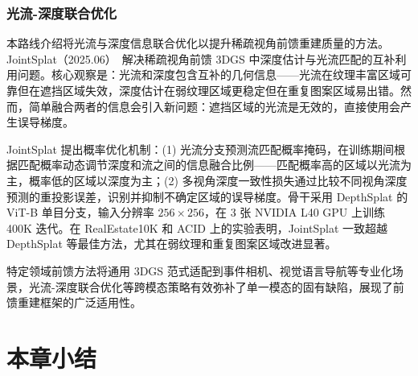 \subsubsection{光流-深度联合优化}

本路线介绍将光流与深度信息联合优化以提升稀疏视角前馈重建质量的方法。JointSplat（2025.06）~\cite{2506_03872}解决稀疏视角前馈 3DGS 中深度估计与光流匹配的互补利用问题。核心观察是：光流和深度包含互补的几何信息——光流在纹理丰富区域可靠但在遮挡区域失效，深度估计在弱纹理区域更稳定但在重复图案区域易出错。然而，简单融合两者的信息会引入新问题：遮挡区域的光流是无效的，直接使用会产生误导梯度。

JointSplat 提出概率优化机制：(1) 光流分支预测流匹配概率掩码，在训练期间根据匹配概率动态调节深度和流之间的信息融合比例——匹配概率高的区域以光流为主，概率低的区域以深度为主；(2) 多视角深度一致性损失通过比较不同视角深度预测的重投影误差，识别并抑制不确定区域的误导梯度。骨干采用 DepthSplat 的 ViT-B 单目分支，输入分辨率 $256 \times 256$，在 3 张 NVIDIA L40 GPU 上训练 400K 迭代。在 RealEstate10K 和 ACID 上的实验表明，JointSplat 一致超越 DepthSplat 等最佳方法，尤其在弱纹理和重复图案区域改进显著。

\begin{takeaway}
特定领域前馈方法将通用 3DGS 范式适配到事件相机、视觉语言导航等专业化场景，光流-深度联合优化等跨模态策略有效弥补了单一模态的固有缺陷，展现了前馈重建框架的广泛适用性。
\end{takeaway}




\section*{本章小结}

